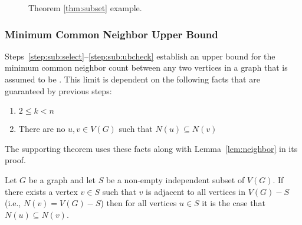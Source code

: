 \begin{figure}[H]
  \centering
  \caption{Theorem \ref{thm:subset} example.}
  \label{fig:subset}
\end{figure}

\subsubsection{Minimum Common Neighbor Upper Bound}\label{sec:sub:sub:common}

Steps~\ref{step:sub:select}--\ref{step:sub:ubcheck} establish an upper bound for the minimum common neighbor count
between any two vertices in a graph that is assumed to be .  This limit is dependent on the following
facts that are guaranteed by previous steps:

\begin{enumerate}
\item \(2\le k<n\)
\item There are no \(u,v\in V(G)\) such that \(N(u)\subseteq N(v)\)
\end{enumerate}

The supporting theorem uses these facts along with Lemma~\ref{lem:neighbor} in its proof.

\begin{lemma}
  \label{lem:neighbor}
  Let \(G\) be a graph and let \(S\) be a non-empty independent subset of \(V(G)\).  If there exists a vertex
  \(v\in S\) such that \(v\) is adjacent to all vertices in \(V(G)-S\) (i.e., \(N(v)=V(G)-S\)) then for all
  vertices \(u\in S\) it is the case that \(N(u)\subseteq N(v)\).
\end{lemma}

